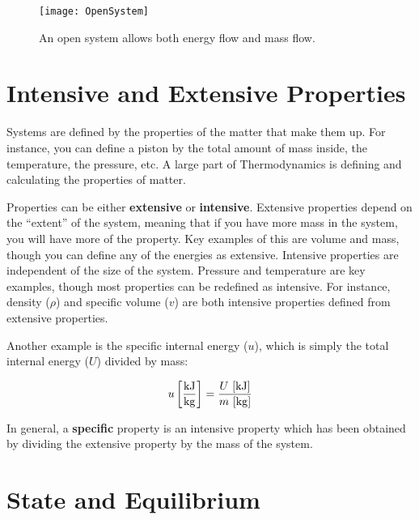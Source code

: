 \begin{figure}[H]
\centering
\texttt{[image: OpenSystem]}
\caption{An open system allows both energy flow and mass flow.}
\label{fig:ch1_openSystem}
\end{figure}

\section{Intensive and Extensive Properties}

Systems are defined by the properties of the matter that make them up.  For instance, you can define a piston by the total amount of mass inside, the temperature, the pressure, etc.  A large part of Thermodynamics is defining and calculating the properties of matter.

Properties can be either {\bf extensive} or {\bf intensive}.  Extensive properties depend on the ``extent'' of the system, meaning that if you have more mass in the system, you will have more of the property.  Key examples of this are volume and mass, though you can define any of the energies as extensive.  Intensive properties are independent of the size of the system.  Pressure and temperature are key examples, though most properties can be redefined as intensive. For instance, density ($\rho$) and specific volume ($v$) are both intensive properties defined from extensive properties.

Another example is the specific internal energy ($u$), which is simply the total internal energy ($U$) divided by mass:

\begin{equation*}
u \left[\frac{\rm kJ}{\rm kg}\right] = \frac{U\ [{\rm kJ}]}{m\ [{\rm kg}]}
\end{equation*}

In general, a {\bf specific} property is an intensive property which has been obtained by dividing the extensive property by the mass of the system.

\section{State and Equilibrium} \label{sec:states}

